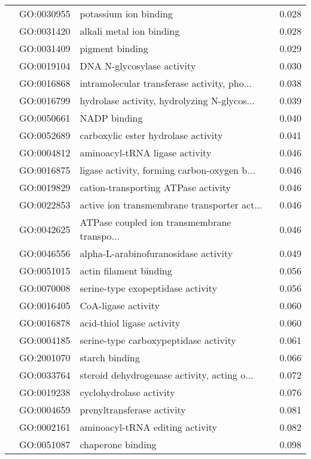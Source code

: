 \begin{longtable}{lllr}
   & GO:0030955 &                        potassium ion binding &         0.028 \\
   & GO:0031420 &                     alkali metal ion binding &         0.028 \\
   & GO:0031409 &                              pigment binding &         0.029 \\
   & GO:0019104 &                   DNA N-glycosylase activity &         0.030 \\
   & GO:0016868 &  intramolecular transferase activity, pho... &         0.038 \\
   & GO:0016799 &  hydrolase activity, hydrolyzing N-glycos... &         0.039 \\
   & GO:0050661 &                                 NADP binding &         0.040 \\
   & GO:0052689 &          carboxylic ester hydrolase activity &         0.041 \\
   & GO:0004812 &               aminoacyl-tRNA ligase activity &         0.046 \\
   & GO:0016875 &  ligase activity, forming carbon-oxygen b... &         0.046 \\
   & GO:0019829 &          cation-transporting ATPase activity &         0.046 \\
   & GO:0022853 &  active ion transmembrane transporter act... &         0.046 \\
   & GO:0042625 &  ATPase coupled ion transmembrane transpo... &         0.046 \\
   & GO:0046556 &         alpha-L-arabinofuranosidase activity &         0.049 \\
   & GO:0051015 &                       actin filament binding &         0.056 \\
   & GO:0070008 &            serine-type exopeptidase activity &         0.056 \\
   & GO:0016405 &                          CoA-ligase activity &         0.060 \\
   & GO:0016878 &                   acid-thiol ligase activity &         0.060 \\
   & GO:0004185 &        serine-type carboxypeptidase activity &         0.061 \\
   & GO:2001070 &                               starch binding &         0.066 \\
   & GO:0033764 &  steroid dehydrogenase activity, acting o... &         0.072 \\
   & GO:0019238 &                      cyclohydrolase activity &         0.076 \\
   & GO:0004659 &                   prenyltransferase activity &         0.081 \\
   & GO:0002161 &              aminoacyl-tRNA editing activity &         0.082 \\
   & GO:0051087 &                            chaperone binding &         0.098 \\
\end{longtable}
